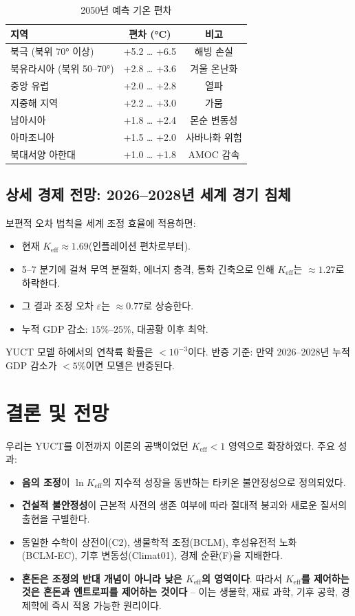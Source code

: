 \documentclass[12pt,a4paper]{article}
\newcommand{\Keff}{K_{\mathrm{eff}}}
\begin{document}
	\begin{table}[H]
		\centering
		\caption{2050년 예측 기온 편차}
		\begin{tabular}{lcc}
			\toprule
			지역 & 편차 (°C) & 비고 \\
			\midrule
			북극 (북위 70° 이상) & +5.2 … +6.5 & 해빙 손실 \\
			북유라시아 (북위 50–70°) & +2.8 … +3.6 & 겨울 온난화 \\
			중앙 유럽 & +2.0 … +2.8 & 열파 \\
			지중해 지역 & +2.2 … +3.0 & 가뭄 \\
			남아시아 & +1.8 … +2.4 & 몬순 변동성 \\
			아마조니아 & +1.5 … +2.0 & 사바나화 위험 \\
			북대서양 아한대 & +1.0 … +1.8 & AMOC 감속 \\
			\bottomrule
		\end{tabular}
	\end{table}
	
	\subsection{상세 경제 전망: 2026–2028년 세계 경기 침체}
	
	보편적 오차 법칙을 세계 조정 효율에 적용하면:
	\begin{itemize}
		\item 현재 \(\Keff \approx 1.69\)(인플레이션 편차로부터).
		\item 5–7 분기에 걸쳐 무역 분절화, 에너지 충격, 통화 긴축으로 인해 \(\Keff\)는 \(\approx 1.27\)로 하락한다.
		\item 그 결과 조정 오차 \(\varepsilon\)는 \(\approx 0.77\)로 상승한다.
		\item 누적 GDP 감소: \(15\%\)–\(25\%\), 대공황 이후 최악.
	\end{itemize}
	YUCT 모델 하에서의 연착륙 확률은 \(<10^{-3}\)이다.
	반증 기준: 만약 2026–2028년 누적 GDP 감소가 \(<5\%\)이면 모델은 반증된다.
	
	\section{결론 및 전망}
	
	우리는 YUCT를 이전까지 이론의 공백이었던 \(\Keff < 1\) 영역으로 확장하였다. 주요 성과:
	
	\begin{itemize}
		\item \textbf{음의 조정}이 \(\ln \Keff\)의 지수적 성장을 동반하는 타키온 불안정성으로 정의되었다.
		\item \textbf{건설적 불안정성}이 근본적 사전의 생존 여부에 따라 절대적 붕괴와 새로운 질서의 출현을 구별한다.
		\item 동일한 수학이 상전이(C2), 생물학적 조정(BCLM), 후성유전적 노화(BCLM‑EC), 기후 변동성(Climat01), 경제 순환(F)을 지배한다.
		\item \textbf{혼돈은 조정의 반대 개념이 아니라 낮은 \(\Keff\)의 영역이다}. 따라서 \textbf{\(\Keff\)를 제어하는 것은 혼돈과 엔트로피를 제어하는 것이다} – 이는 생물학, 재료 과학, 기후 공학, 경제학에 즉시 적용 가능한 원리이다.
	\end{itemize}
	
\end{document}
